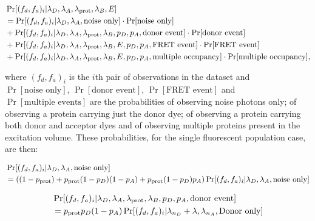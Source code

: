 \begin{equation}
\begin{aligned}
\footnotesize
&\Pr[(f_d, f_a)_i|\lambda_D, \lambda_A, \lambda_{\text{prot}}, \lambda_B, E] \\ 
&= \Pr[(f_d, f_a)_i|\lambda_D, \lambda_A, \text{noise only}] \cdot \Pr[\text{noise only}] \\
&+ \Pr[(f_d, f_a)_i|\lambda_D, \lambda_A, \lambda_{\text{prot}}, \lambda_B, p_D, p_A, \text{donor event}] \cdot \Pr[\text{donor event}]\\ 
&+ \Pr[(f_d, f_a)_i|\lambda_D, \lambda_A, \lambda_{\text{prot}}, \lambda_B, E, p_D, p_A, \text{FRET event}] \cdot \Pr[\text{FRET event}] \\
&+ \Pr[(f_d, f_a)_i|\lambda_D, \lambda_A, \lambda_{\text{prot}}, \lambda_B, E, p_D, p_A, \text{multiple occupancy}] \cdot \Pr[\text{multiple occupancy}], \\
\label{eq:multi_sum}
\end{aligned}
\end{equation}


where $(f_d, f_a)_i$ is the $i$th pair of observations in the dataset and $\Pr[\text{noise only}]$, $\Pr[\text{donor event}]$, $\Pr[\text{FRET event}]$ and $\Pr[\text{multiple events}]$ are the probabilities of observing noise photons only; of observing a protein carrying just the donor dye; of observing a protein carrying both donor and acceptor dyes and of observing multiple proteins present in the excitation volume.  These probabilities, for the single fluorescent population case, are then:   

\begin{equation}
\begin{aligned}
\footnotesize
&\Pr[(f_d, f_a)_i|\lambda_D, \lambda_A, \text{noise only}] \\
&= ((1-p_{\text{prot}}) + p_{\text{prot}}(1-p_D)(1-p_A) + p_{\text{prot}}(1-p_D)p_A)\Pr[(f_d, f_a)_i|\lambda_{D}, \lambda_{A}, \text{noise only}] 
\label{eq:noise_only}
\end{aligned}
\end{equation}

\begin{equation}
\begin{aligned}
\footnotesize
&\Pr[(f_d, f_a)_i|\lambda_D, \lambda_A, \lambda_{\text{prot}}, \lambda_B, p_D, p_A, \text{donor event}] \\
&= p_{\text{prot}}p_D(1-p_A)\Pr[(f_d, f_a)_i|\lambda_{n_D}+\lambda, \lambda_{n_A}, \text{Donor only}] 
\label{eq:donor_only}
\end{aligned}
\end{equation}

